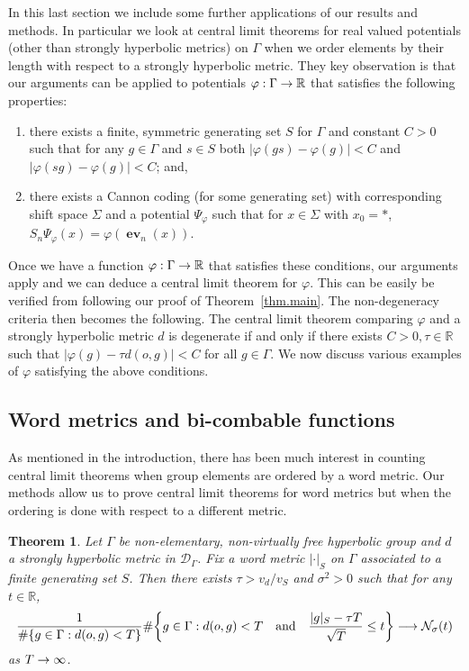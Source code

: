 \documentclass[10pt]{amsart}
\newtheorem{theo}{Theorem}[section]
\theoremstyle{definition}\newtheorem{defi}[theo]{Definition}\newtheorem{rema}[theo]{Remark}\newtheorem{exam}[theo]{Example}\newtheorem{exem}[theo]{Example}\newtheorem{nota}[theo]{Notation}
\newcommand{\G}{\Gamma}
\renewcommand{\P}{\Psi}
\newcommand{\Dc}{\mathcal{D}}
\newcommand{\Nc}{\mathcal{N}}
\newcommand{\R}{\mathbb{R}}
\DeclareMathOperator{\ev}{\mathbf{ev}}
\let\originalleft\left
\let\originalright\right
\renewcommand{\left}{\mathopen{}\mathclose\bgroup\originalleft}
\renewcommand{\right}{\aftergroup\egroup\originalright}
\renewcommand*{\to}{\mathchoice{\longrightarrow}{\rightarrow}{\rightarrow}{\rightarrow}}
\theoremstyle{plain}
\newcommand*{\relabel}{\renewcommand{\labelenumi}{(\theenumi)}}
\newcommand*{\romanenumi}{\renewcommand*{\theenumi}{\roman{enumi}}\relabel}
\begin{document}
In this last section we include some further applications of our results and methods. In particular we look at central limit theorems for real valued potentials (other than strongly hyperbolic metrics) on $\G$ when we order elements by their length with respect to a strongly hyperbolic metric. They key observation is that our arguments can be applied to potentials $\varphi : \G \to \R$ that satisfies the following properties:
\begin{enumerate}\romanenumi
\item \label{sect4.i} there exists a finite, symmetric generating set $S$ for $\G$ and constant $C >0$ such that for any $g \in \G$ and $s \in S$ both $|\varphi(gs) - \varphi(g)| < C$ and $|\varphi(sg) - \varphi(g)| < C$; and,
\item\label{sect4.ii} there exists a Cannon coding (for some generating set) with corresponding shift space $\Sigma$ and a potential $\P_{\varphi}$ such that for $x \in \Sigma$ with $x_0 = \ast$, $S_n \P_{\varphi}(x)= \varphi(\ev_n(x))$.
\end{enumerate}
Once we have a function $\varphi: \G \to \R$ that satisfies these conditions, our arguments apply and we can deduce a central limit theorem for $\varphi$. This can be easily be verified from following our proof of Theorem~\ref{thm.main}. The non-degeneracy criteria then becomes the following. The central limit theorem comparing $\varphi$ and a strongly hyperbolic metric $d$ is degenerate if and only if there exists $C >0, \tau \in \R$ such that $|\varphi(g) - \tau d(o,g) |<C$ for all $g \in \G$. We now discuss various examples of $\varphi$ satisfying the above conditions.

\subsection{Word metrics and bi-combable functions} As mentioned in the introduction, there has been much interest in counting central limit theorems when group elements are ordered by a word metric. Our methods allow us to prove central limit theorems for word metrics but when the ordering is done with respect to a different metric.

\begin{theo}
Let $\G$ be non-elementary, non-virtually free hyperbolic group and $d$ a strongly hyperbolic metric in $\Dc_\G$. Fix a word metric $|\cdot|_S$ on $\G$ associated to a finite generating set $S$. Then there exists $\tau > v_d/v_S$ and $\sigma^2 > 0$ such that for any $t \in \R$,
\[
\frac{1}{\#\{ g\in\G: d(o,g) < T\}} \#\left\{ g\in\G: d(o,g) < T \quad \text{and} \quad \frac{|g|_S - \tau T}{\sqrt{T}} \le t \right\} \to \Nc_\sigma(t)
\]
as $T\to\infty$.
\end{theo}
\end{document}
